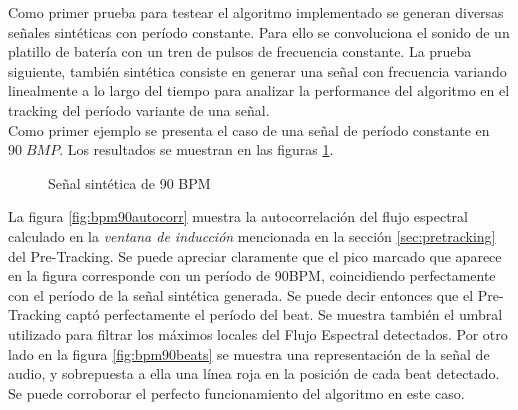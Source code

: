 \documentclass[12pt,a4paper,titlepage]{report}
\begin{document}
Como primer prueba para testear el algoritmo implementado se generan diversas señales sintéticas con período constante. Para ello se convoluciona el sonido de un platillo de batería con un tren de pulsos de frecuencia constante. La prueba siguiente, también sintética consiste en generar una señal con frecuencia variando linealmente a lo largo del tiempo para analizar la performance del algoritmo en el tracking del período variante de una señal.\\

Como primer ejemplo se presenta el caso de una señal de período constante en $90\;BMP$. Los resultados se muestran en las figuras \ref{fig:90BPM}.

\begin{figure} [h!]
\centering
  \caption{Señal sintética de 90 BPM}
  \label{fig:90BPM}
\end{figure}

La figura \ref{fig:bpm90autocorr} muestra la autocorrelación del flujo espectral calculado en la \emph{ventana de inducción} mencionada en la sección \ref{sec:pretracking} del Pre-Tracking. Se puede apreciar claramente que el pico marcado que aparece en la figura corresponde con un período de 90BPM, coincidiendo perfectamente con el período de la señal sintética generada. Se puede decir entonces que el Pre-Tracking captó perfectamente el período del beat. Se muestra también el umbral utilizado para filtrar los máximos locales del Flujo Espectral detectados. Por otro lado en la figura \ref{fig:bpm90beats} se muestra una representación de la señal de audio, y sobrepuesta a ella una línea roja en la posición de cada beat detectado. Se puede corroborar el perfecto funcionamiento del algoritmo en este caso.\\
\end{document}
